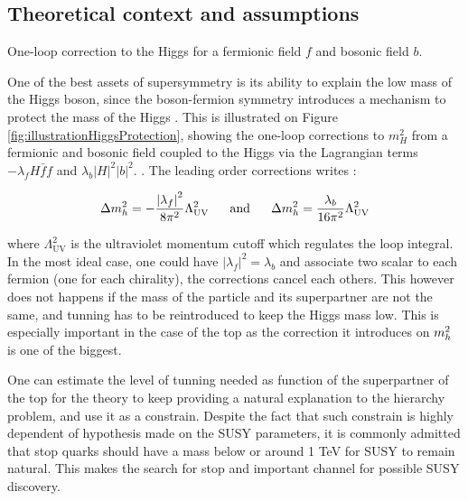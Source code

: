         \subsection{Theoretical context and assumptions}

                     { One-loop correction to the Higgs for a fermionic field $f$ and bosonic field $b$.}

        One of the best assets of supersymmetry is its ability to explain the low mass
        of the Higgs boson, since the boson-fermion symmetry introduces a mechanism to
        protect the mass of the Higgs . This is illustrated on Figure
        \ref{fig:illustrationHiggsProtection}, showing the one-loop corrections to $m_H^2$
        from a fermionic and bosonic field coupled to the Higgs via the Lagrangian terms
        $- \lambda_f H \bar{f} f$ and $\lambda_b \left| H \right|^2 \left| b \right|^2$.
        . The leading order corrections writes :

        \begin{equation}
            \Delta m_{h}^2 = - \frac{\left| \lambda_f \right|^2}{8\pi^2} \Lambda^2_{\text{UV}}
            \, \, \, \, \, \, \, \, \, \, \text{and} \, \, \, \, \, \, \, \, \, \,
            \Delta m_{h}^2 =   \frac{\lambda_b}{16\pi^2} \Lambda^2_{\text{UV}}
        \end{equation}

        where $\Lambda^2_{\text{UV}}$ is the ultraviolet momentum cutoff which regulates
        the loop integral. In the most ideal case, one could have $\left| \lambda_f \right|^2
        = \lambda_b$ and associate two scalar to each fermion (one for each chirality), 
        the corrections cancel each others. 
        This however does not happens if the mass of the particle and its superpartner 
        are not the same, and tunning has to be reintroduced to keep the Higgs mass low.
        This is especially important in the case of the top as the correction it introduces
        on $m_{h}^2$ is one of the biggest. 
        
        One can estimate the level of tunning needed as function of the superpartner of
        the top for the theory to keep providing a natural explanation to the hierarchy
        problem, and use it as a constrain. Despite the fact that such constrain is 
        highly dependent of hypothesis made on the SUSY parameters, it is commonly admitted 
        that stop quarks should have a mass below or around 1 TeV for SUSY to remain natural.
        This makes the search for stop and important channel for possible SUSY discovery.


